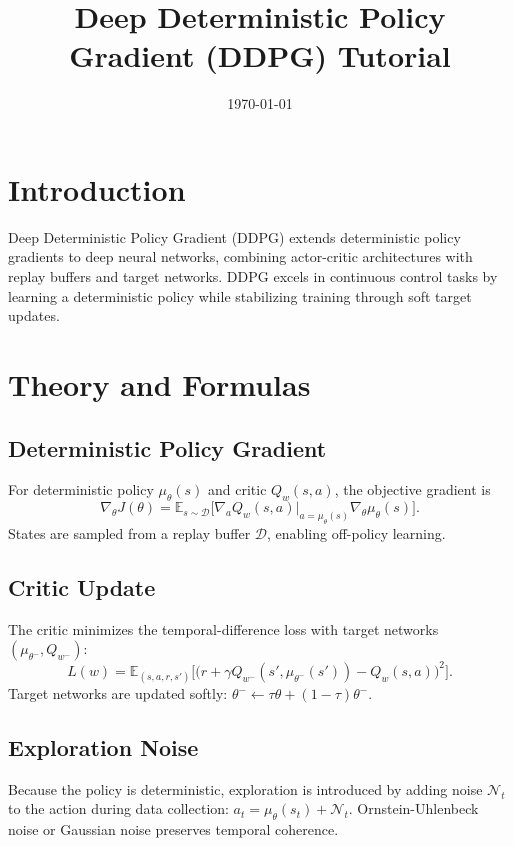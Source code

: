 ﻿\documentclass[12pt]{article}
\title{Deep Deterministic Policy Gradient (DDPG) Tutorial}
\author{}
\date{\today}
\begin{document}
\maketitle

\section{Introduction}
Deep Deterministic Policy Gradient (DDPG) extends deterministic policy gradients to deep neural networks, combining actor-critic architectures with replay buffers and target networks. DDPG excels in continuous control tasks by learning a deterministic policy while stabilizing training through soft target updates.

\section{Theory and Formulas}
\subsection{Deterministic Policy Gradient}
For deterministic policy \(\mu_\theta(s)\) and critic \(Q_w(s,a)\), the objective gradient is
\begin{equation}
\nabla_\theta J(\theta) = \mathbb{E}_{s \sim \mathcal{D}}\big[ \nabla_a Q_w(s,a)\big|_{a=\mu_\theta(s)} \nabla_\theta \mu_\theta(s) \big].
\end{equation}
States are sampled from a replay buffer \(\mathcal{D}\), enabling off-policy learning.

\subsection{Critic Update}
The critic minimizes the temporal-difference loss with target networks \((\mu_{\theta^-}, Q_{w^-})\):
\begin{equation}
L(w) = \mathbb{E}_{(s,a,r,s')}\Big[ \big( r + \gamma Q_{w^-}(s', \mu_{\theta^-}(s')) - Q_w(s,a) \big)^2 \Big].
\end{equation}
Target networks are updated softly: \(\theta^- \leftarrow \tau \theta + (1-\tau)\theta^-\).

\subsection{Exploration Noise}
Because the policy is deterministic, exploration is introduced by adding noise \(\mathcal{N}_t\) to the action during data collection: \(a_t = \mu_\theta(s_t) + \mathcal{N}_t\). Ornstein-Uhlenbeck noise or Gaussian noise preserves temporal coherence.
\end{document}
